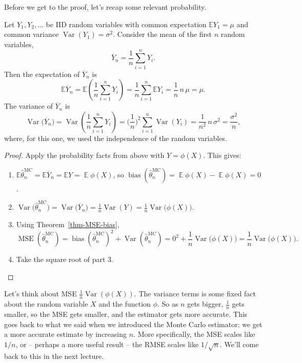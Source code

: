 \documentclass[
  letterpaper,
  DIV=11,
  numbers=noendperiod]{scrreprt}
\newcommand{\Exg}{\operatorname{\mathbb{E}}}
\newcommand{\Ex}{\mathbb{E}}
\newcommand{\Var}{\operatorname{Var}}
\theoremstyle{plain}
\theoremstyle{definition}
\theoremstyle{definition}
\theoremstyle{remark}
\begin{document}
Before we get to the proof, let's recap some relevant probability.

Let \(Y_1, Y_2, \dots\) be IID random variables with common expectation
\(\mathbb EY_1 = \mu\) and common variance
\(\operatorname{Var}(Y_1) = \sigma^2\). Consider the mean of the first
\(n\) random variables,
\[ \overline{Y}_n = \frac{1}{n} \sum_{i=1}^n Y_i . \] Then the
expectation of \(\overline{Y}_n\) is
\[ \mathbb E \overline{Y}_n = \mathbb E\left(\frac{1}{n}\sum_{i=1}^n Y_i\right) = \frac{1}{n} 
\sum_{i=1}^n \mathbb{E}Y_i = \frac{1}{n}\,n\,\mu = \mu . \] The variance
of \(\overline{Y}_n\) is
\[ \operatorname{Var}\big(  \overline{Y}_n \big)= \operatorname{Var} \left(\frac{1}{n}\sum_{i=1}^n Y_i\right) = \bigg(\frac{1}{n}\bigg)^2 
\sum_{i=1}^n \operatorname{Var}(Y_i) = \frac{1}{n^2}\,n\,\sigma^2 = \frac{\sigma^2}{n} , \]
where, for this one, we used the independence of the random variables.

\begin{proof}
Apply the probability facts from above with \(Y = \phi(X)\). This gives:

\begin{enumerate}
\def\labelenumi{\arabic{enumi}.}
\item
  \(\Ex \widehat{\theta}_n^{\mathrm{MC}} = \Ex \overline Y_n = \Ex Y = \Exg \phi(X)\),
  so
  \(\operatorname{bias}(\widehat{\theta}_n^{\mathrm{MC}}) = \Exg \phi(X) - \Exg \phi(X) = 0\).
\item
  \({\displaystyle \operatorname{Var}\big(\widehat{\theta}_n^{\mathrm{MC}}\big) = \operatorname{Var}\big(\overline Y_n\big) = \frac{1}{n} \operatorname{Var}(Y) = \frac{1}{n} \operatorname{Var}\big(\phi(X)\big)}\).
\item
  Using Theorem~\ref{thm-MSE-bias},
  \[\operatorname{MSE}(\widehat{\theta}_n^{\mathrm{MC}}) = \operatorname{bias}(\widehat{\theta}_n^{\mathrm{MC}})^2 + \operatorname{Var}(\widehat{\theta}_n^{\mathrm{MC}}) = 0^2 + \frac{1}{n} \operatorname{Var}\big(\phi(X)\big) = \frac{1}{n} \operatorname{Var}\big(\phi(X)\big) . \]
\item
  Take the square root of part 3.
\end{enumerate}

\end{proof}

Let's think about MSE \(\frac{1}{n} \Var(\phi(X))\). The variance terms
is some fixed fact about the random variable \(X\) and the function
\(\phi\). So as \(n\) gets bigger, \(\frac{1}{n}\) gets smaller, so the
MSE gets smaller, and the estimator gets more accurate. This goes back
to what we said when we introduced the Monte Carlo estimator: we get a
more accurate estimate by increasing \(n\). More specifically, the MSE
scales like \(1/n\), or -- perhaps a more useful result -- the RMSE
scales like \(1/\sqrt{n}\). We'll come back to this in the next lecture.
\end{document}
